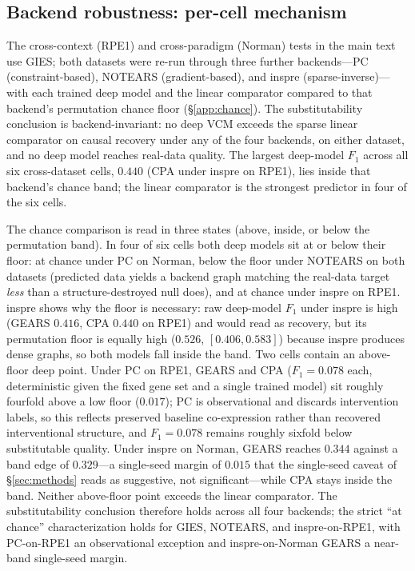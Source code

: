 \documentclass{article}
\theoremstyle{plain}
\theoremstyle{definition}
\theoremstyle{remark}
\begin{document}
\subsection{Backend robustness: per-cell mechanism}
\label{app:backend-discuss}
The cross-context (RPE1) and cross-paradigm (Norman) tests in the main text use GIES; both datasets were re-run through three further backends---PC (constraint-based), NOTEARS (gradient-based), and inspre (sparse-inverse)---with each trained deep model and the linear comparator compared to that backend's permutation chance floor (\S\ref{app:chance}). The substitutability conclusion is backend-invariant: no deep VCM exceeds the sparse linear comparator on causal recovery under any of the four backends, on either dataset, and no deep model reaches real-data quality. The largest deep-model $F_1$ across all six cross-dataset cells, $0.440$ (CPA under inspre on RPE1), lies inside that backend's chance band; the linear comparator is the strongest predictor in four of the six cells.

The chance comparison is read in three states (above, inside, or below the permutation band). In four of six cells both deep models sit at or below their floor: at chance under PC on Norman, below the floor under NOTEARS on both datasets (predicted data yields a backend graph matching the real-data target \emph{less} than a structure-destroyed null does), and at chance under inspre on RPE1. inspre shows why the floor is necessary: raw deep-model $F_1$ under inspre is high (GEARS $0.416$, CPA $0.440$ on RPE1) and would read as recovery, but its permutation floor is equally high ($0.526$, $[0.406, 0.583]$) because inspre produces dense graphs, so both models fall inside the band. Two cells contain an above-floor deep point. Under PC on RPE1, GEARS and CPA ($F_1 = 0.078$ each, deterministic given the fixed gene set and a single trained model) sit roughly fourfold above a low floor ($0.017$); PC is observational and discards intervention labels, so this reflects preserved baseline co-expression rather than recovered interventional structure, and $F_1 = 0.078$ remains roughly sixfold below substitutable quality. Under inspre on Norman, GEARS reaches $0.344$ against a band edge of $0.329$---a single-seed margin of $0.015$ that the single-seed caveat of \S\ref{sec:methods} reads as suggestive, not significant---while CPA stays inside the band. Neither above-floor point exceeds the linear comparator. The substitutability conclusion therefore holds across all four backends; the strict ``at chance'' characterization holds for GIES, NOTEARS, and inspre-on-RPE1, with PC-on-RPE1 an observational exception and inspre-on-Norman GEARS a near-band single-seed margin.
\end{document}
